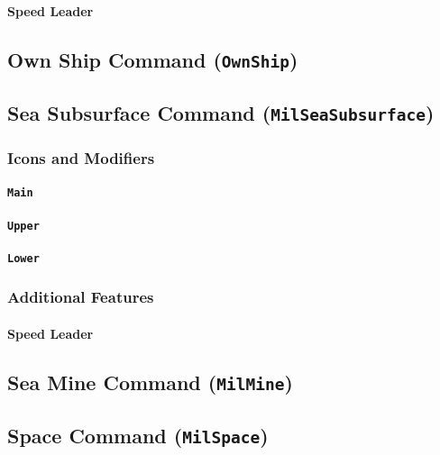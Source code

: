 \documentclass[a4paper, titlepage]{article}
\begin{document}
\paragraph{Speed Leader}

\subsection{Own Ship Command (\textbf{\texttt{OwnShip}})}

\subsection{Sea Subsurface Command (\textbf{\texttt{MilSeaSubsurface}})}

\subsubsection{Icons and Modifiers}

\paragraph{\texttt{Main}}
%

\paragraph{\texttt{Upper}}
%

\paragraph{\texttt{Lower}}
%

\subsubsection{Additional Features}

\paragraph{Speed Leader}

\subsection{Sea Mine Command (\textbf{\texttt{MilMine}})}

\subsection{Space Command (\textbf{\texttt{MilSpace}})}
\end{document}
